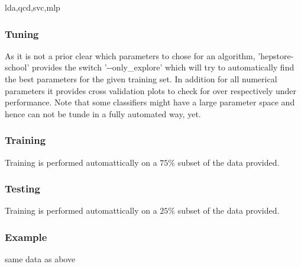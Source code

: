 \documentclass[aps,prd,11pt,tightenlines,superscriptaddress,nofootinbib,preprintnumbers,notitlepage]{revtex4-1}
\begin{document}
lda,qcd,svc,mlp

\subsubsection{Tuning}

As it is not a prior clear which parameters to chose for an algorithm, 'hepstore-school' provides the switch '-{}-only\_explore' which will try to automatically find the best parameters for the given training set. In addition for all numerical parameters it provides cross validation plots to check for over respectively under performance. Note that some classifiers might have a large parameter space and hence can not be tunde in a fully automated way, yet.

\subsubsection{Training}

Training is performed automattically on a $75\%$ subset of the data provided.

\subsubsection{Testing}

Training is performed automattically on a $25\%$ subset of the data provided.

\subsubsection{Example}

same data as above
\end{document}
